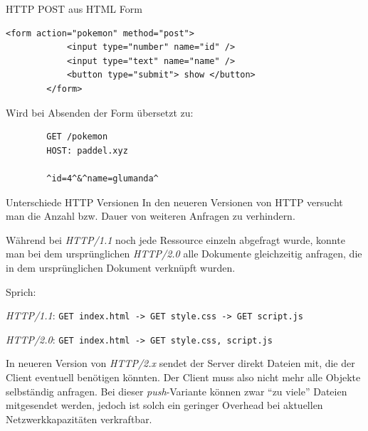 \begin{bonus}{HTTP POST aus HTML Form}
    \begin{lstlisting}[language=HTML5]
        <form action="pokemon" method="post">
            <input type="number" name="id" />
            <input type="text" name="name" />
            <button type="submit"> show </button>
        </form>
    \end{lstlisting}

    Wird bei Absenden der Form übersetzt zu:

    \begin{lstlisting}
        GET /pokemon
        HOST: paddel.xyz

        ^id=4^&^name=glumanda^
    \end{lstlisting}
\end{bonus}

\begin{bonus}{Unterschiede HTTP Versionen}
    In den neueren Versionen von HTTP versucht man die Anzahl bzw. Dauer von weiteren Anfragen zu verhindern.

    Während bei \emph{HTTP/1.1} noch jede Ressource einzeln abgefragt wurde, konnte man bei dem ursprünglichen \emph{HTTP/2.0} alle Dokumente gleichzeitig anfragen, die in dem ursprünglichen Dokument verknüpft wurden.

    Sprich:

    \emph{HTTP/1.1}: \texttt{GET index.html -> GET style.css -> GET script.js}

    \emph{HTTP/2.0}: \texttt{GET index.html -> GET style.css,  script.js}

    In neueren Version von \emph{HTTP/2.x} sendet der Server direkt Dateien mit, die der Client eventuell benötigen könnten.
    Der Client muss also nicht mehr alle Objekte selbständig anfragen.
    Bei dieser \emph{push}-Variante können zwar \enquote{zu viele} Dateien mitgesendet werden, jedoch ist solch ein geringer Overhead bei aktuellen Netzwerkkapazitäten verkraftbar.
\end{bonus}